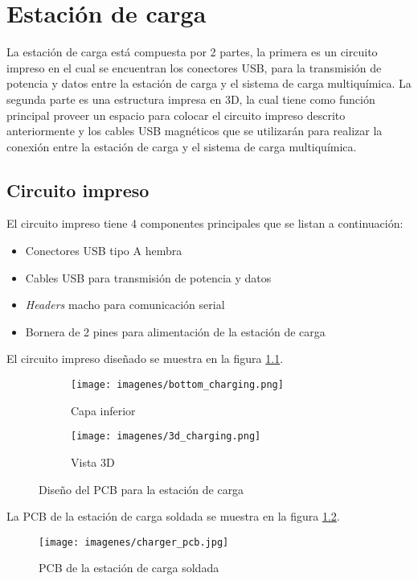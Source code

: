     
        


\chapter{Estación de carga}

La estación de carga está compuesta por 2 partes, la primera es un circuito impreso
en el cual se encuentran los conectores USB, para la transmisión de potencia y 
datos entre la estación de carga y el sistema de carga multiquímica. La segunda
parte es una estructura impresa en 3D, la cual tiene como función principal
proveer un espacio para colocar el circuito impreso descrito anteriormente y 
los cables USB magnéticos que se utilizarán para realizar la conexión entre
la estación de carga y el sistema de carga multiquímica.


\section{Circuito impreso}

El circuito impreso tiene 4 componentes principales que se listan a continuación:

\begin{itemize}
    \item Conectores USB tipo A hembra
    \item Cables USB para transmisión de potencia y datos
    \item \textit{Headers} macho para comunicación serial
    \item Bornera de 2 pines para alimentación de la estación de carga
\end{itemize}
El circuito impreso diseñado se muestra en la figura \ref{fig:pcb_estacion_carga}.

\begin{figure}[H]
    \centering
    \begin{subfigure}{0.9\linewidth}
        \centering
        \texttt{[image: imagenes/bottom\_charging.png]}
        \caption{Capa inferior}
    \end{subfigure}
    \vfill
    \begin{subfigure}{0.9\linewidth}
        \centering
        \texttt{[image: imagenes/3d\_charging.png]}
        \caption{Vista 3D}
    \end{subfigure}
    \caption{Diseño del PCB para la estación de carga}
    \label{fig:pcb_estacion_carga}
\end{figure}

La PCB de la estación de carga soldada se muestra en la figura \ref{fig:pcb_estacion_carga_soldada}.

\begin{figure}[H]
    \centering
    \texttt{[image: imagenes/charger\_pcb.jpg]}
    \caption{PCB de la estación de carga soldada}
    \label{fig:pcb_estacion_carga_soldada}
\end{figure}